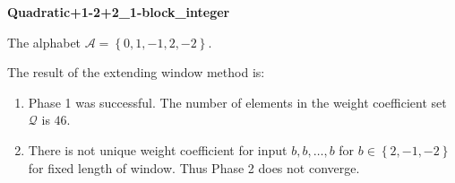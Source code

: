 \begin{exmp}
\textbf{ Quadratic+1-2+2\_1-block\_integer }

\label{ex:Quadratic+1-2+21-blockinteger}

The alphabet $\mathcal{A} =\left\{0, 1, -1, 2, -2\right\}$.

The result of the extending window method is:
\begin{enumerate}
    \item Phase 1 was successful.
The number of elements in the weight coefficient set $\mathcal{Q}$ is $46$.

    \item There is not unique weight coefficient for input $b,b,\dots,b$ for $b\in\left\{2, -1, -2\right\}$ for fixed length of window. Thus Phase 2 does not converge.

\end{enumerate}
\end{exmp}
